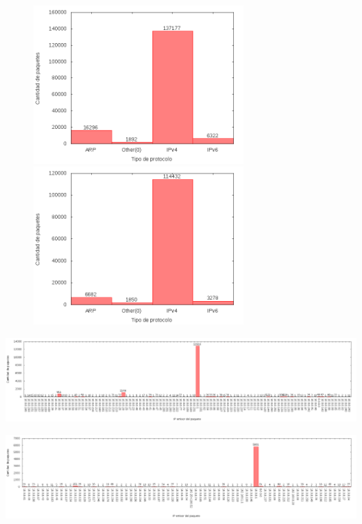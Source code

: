 \begin{figure}[!h]
\centering
\begin{minipage}{8cm}
  \centering
  \includegraphics[width=8cm]{../mediciones/job1/type.png}
\end{minipage}%
\begin{minipage}{8cm}
  \centering
  \includegraphics[width=8cm]{../mediciones/job2/type.png}
\end{minipage}
\end{figure}

\begin{center}
\includegraphics[width=16cm]{../mediciones/job1/src.png}
\end{center}

\begin{center}
\includegraphics[width=16cm]{../mediciones/job2/src.png}
\end{center}

